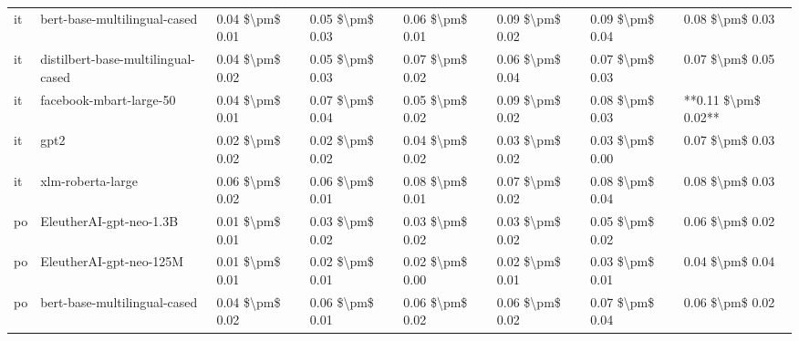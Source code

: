 \begin{tabular}{llllllll}
      it &       bert-base-multilingual-cased & 0.04 \$\textbackslash pm\$ 0.01 &           0.05 \$\textbackslash pm\$ 0.03 &       0.06 \$\textbackslash pm\$ 0.01 &        0.09 \$\textbackslash pm\$ 0.02 &                         0.09 \$\textbackslash pm\$ 0.04 &     0.08 \$\textbackslash pm\$ 0.03 \\
      it & distilbert-base-multilingual-cased & 0.04 \$\textbackslash pm\$ 0.02 &           0.05 \$\textbackslash pm\$ 0.03 &       0.07 \$\textbackslash pm\$ 0.02 &        0.06 \$\textbackslash pm\$ 0.04 &                         0.07 \$\textbackslash pm\$ 0.03 &     0.07 \$\textbackslash pm\$ 0.05 \\
      it &            facebook-mbart-large-50 & 0.04 \$\textbackslash pm\$ 0.01 &           0.07 \$\textbackslash pm\$ 0.04 &       0.05 \$\textbackslash pm\$ 0.02 &        0.09 \$\textbackslash pm\$ 0.02 &                         0.08 \$\textbackslash pm\$ 0.03 & **0.11 \$\textbackslash pm\$ 0.02** \\
      it &                               gpt2 & 0.02 \$\textbackslash pm\$ 0.02 &           0.02 \$\textbackslash pm\$ 0.02 &       0.04 \$\textbackslash pm\$ 0.02 &        0.03 \$\textbackslash pm\$ 0.02 &                         0.03 \$\textbackslash pm\$ 0.00 &     0.07 \$\textbackslash pm\$ 0.03 \\
      it &                  xlm-roberta-large & 0.06 \$\textbackslash pm\$ 0.02 &           0.06 \$\textbackslash pm\$ 0.01 &       0.08 \$\textbackslash pm\$ 0.01 &        0.07 \$\textbackslash pm\$ 0.02 &                         0.08 \$\textbackslash pm\$ 0.04 &     0.08 \$\textbackslash pm\$ 0.03 \\
      po &            EleutherAI-gpt-neo-1.3B & 0.01 \$\textbackslash pm\$ 0.01 &           0.03 \$\textbackslash pm\$ 0.02 &       0.03 \$\textbackslash pm\$ 0.02 &        0.03 \$\textbackslash pm\$ 0.02 &                         0.05 \$\textbackslash pm\$ 0.02 &     0.06 \$\textbackslash pm\$ 0.02 \\
      po &            EleutherAI-gpt-neo-125M & 0.01 \$\textbackslash pm\$ 0.01 &           0.02 \$\textbackslash pm\$ 0.01 &       0.02 \$\textbackslash pm\$ 0.00 &        0.02 \$\textbackslash pm\$ 0.01 &                         0.03 \$\textbackslash pm\$ 0.01 &     0.04 \$\textbackslash pm\$ 0.04 \\
      po &       bert-base-multilingual-cased & 0.04 \$\textbackslash pm\$ 0.02 &           0.06 \$\textbackslash pm\$ 0.01 &       0.06 \$\textbackslash pm\$ 0.02 &        0.06 \$\textbackslash pm\$ 0.02 &                         0.07 \$\textbackslash pm\$ 0.04 &     0.06 \$\textbackslash pm\$ 0.02 \\

\end{tabular}
